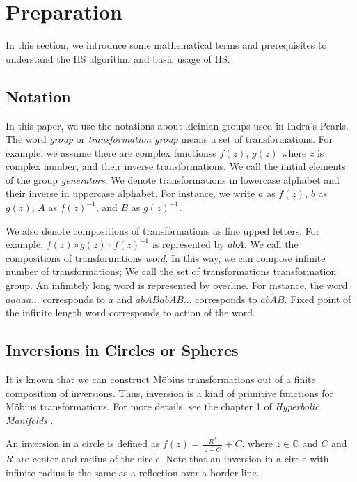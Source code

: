 
\section{Preparation}

In this section, we introduce some mathematical terms and prerequisites
to understand the IIS algorithm and basic usage of IIS.

\subsection{Notation}

In this paper, we use the notations about kleinian groups used in
Indra's Pearls.
The word \textit{group} or \textit{transformation group} means a set of
transformations. 
For example, we assume there are complex functionss $f(z)$, $g(z)$
where $z$ is complex number, and their inverse transformations. %
We call the initial elements of the group \textit{generators}.
We denote transformations in lowercase alphabet and 
their inverse in uppercase alphabet.
For instance, we write $a$ as $f(z)$, $b$ as $g(z)$, $A$ as $f(z)^{-1}$,
and $B$ as $g(z)^{-1}$.

We also denote compositions of transformations as line upped letters.
For example, $f(z) \circ g(z) \circ f(z)^{-1}$ is represented by $abA$.
We call the compositions of transformations \textit{word}.
In this way, we can compose infinite number of transformations;
We call the set of transformations transformation group.
An infinitely long word is represented by overline.
For instance, the word $aaaaa...$ corresponds to $\overline{a}$ and
$abABabAB...$ corresponds to $\overline{abAB}$.
Fixed point of the infinite length word corresponds to action of the
word.

\subsection{Inversions in Circles or Spheres}

It is known that we can construct M\"obius transformations out of a finite
composition of inversions. Thus, inversion is a kind of primitive
functions for M\"obius transformations.
For more details, see the chapter 1 of \textit{Hyperbolic Manifolds}
 \cite{marden_2016}.

An inversion in a circle is defined as $f(z) = \frac{R^2}{~\overline{z -C}~} + C$,
where $z \in \mathbb{C}$ and $C$ and $R$ are center and radius of the circle.
Note that an inversion in a circle with infinite radius is the same as
a reflection over a border line.


